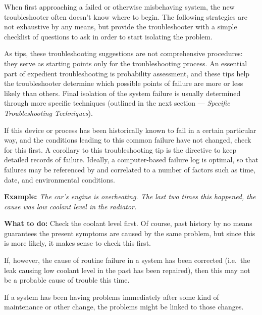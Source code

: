 \stopsection

\startsection[title={General Troubleshooting
Tips},reference={sec:xtocid15790972}]

When first approaching a failed or otherwise misbehaving system, the new
troubleshooter often doesn't know where to begin. The following
strategies are not exhaustive by any means, but provide the
troubleshooter with a simple checklist of questions to ask in order to
start isolating the problem.

As tips, these troubleshooting suggestions are not comprehensive
procedures: they serve as starting points only for the troubleshooting
process. An essential part of expedient troubleshooting is probability
assessment, and these tips help the troubleshooter determine which
possible points of failure are more or less likely than others. Final
isolation of the system failure is usually determined through more
specific techniques (outlined in the next section --- {\em Specific
Troubleshooting Techniques}).

\startsubsection[title={Prior
Occurrence},reference={sec:xtocid15790973}]

If this device or process has been historically known to fail in a
certain particular way, and the conditions leading to this common
failure have not changed, check for this  first. A
corollary to this troubleshooting tip is the directive to keep detailed
records of failure. Ideally, a computer-based failure log is optimal, so
that failures may be referenced by and correlated to a number of factors
such as time, date, and environmental conditions.

{\bf Example:} {\em The car's engine is overheating. The last two times
this happened, the cause was low coolant level in the radiator.}

{\bf What to do:} Check the coolant level first. Of course, past history
by no means guarantees the present symptoms are caused by the same
problem, but since this is more likely, it makes sense to check this
first.

If, however, the cause of routine failure in a system has been corrected
(i.e.~the leak causing low coolant level in the past has been repaired),
then this may not be a probable cause of trouble this time.

\stopsubsection

\startsubsection[title={Recent
Alterations},reference={sec:xtocid15790974}]

If a system has been having problems immediately after some kind of
maintenance or other change, the problems might be linked to those
changes.

